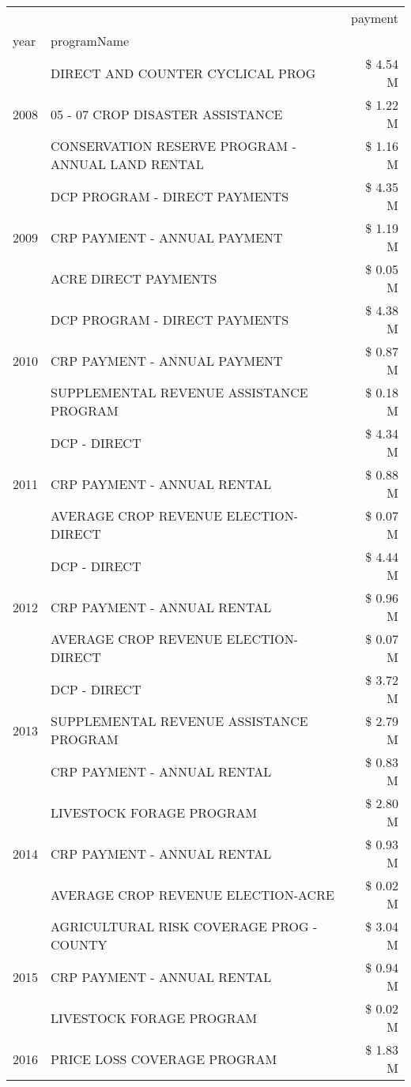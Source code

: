 \begin{tabular}{llr}
\toprule
 &  & payment \\
year & programName &  \\
\midrule
\multirow[t]{3}{*}{2008} & DIRECT AND COUNTER CYCLICAL PROG & \$ 4.54 M \\
 & 05 - 07 CROP DISASTER ASSISTANCE & \$ 1.22 M \\
 & CONSERVATION RESERVE PROGRAM - ANNUAL LAND RENTAL & \$ 1.16 M \\
\cline{1-3}
\multirow[t]{3}{*}{2009} & DCP PROGRAM - DIRECT PAYMENTS & \$ 4.35 M \\
 & CRP PAYMENT - ANNUAL PAYMENT & \$ 1.19 M \\
 & ACRE DIRECT PAYMENTS & \$ 0.05 M \\
\cline{1-3}
\multirow[t]{3}{*}{2010} & DCP PROGRAM - DIRECT PAYMENTS & \$ 4.38 M \\
 & CRP PAYMENT - ANNUAL PAYMENT & \$ 0.87 M \\
 & SUPPLEMENTAL REVENUE ASSISTANCE PROGRAM & \$ 0.18 M \\
\cline{1-3}
\multirow[t]{3}{*}{2011} & DCP - DIRECT & \$ 4.34 M \\
 & CRP PAYMENT - ANNUAL RENTAL & \$ 0.88 M \\
 & AVERAGE CROP REVENUE ELECTION-DIRECT & \$ 0.07 M \\
\cline{1-3}
\multirow[t]{3}{*}{2012} & DCP - DIRECT & \$ 4.44 M \\
 & CRP PAYMENT - ANNUAL RENTAL & \$ 0.96 M \\
 & AVERAGE CROP REVENUE ELECTION-DIRECT & \$ 0.07 M \\
\cline{1-3}
\multirow[t]{3}{*}{2013} & DCP - DIRECT & \$ 3.72 M \\
 & SUPPLEMENTAL REVENUE ASSISTANCE PROGRAM & \$ 2.79 M \\
 & CRP PAYMENT - ANNUAL RENTAL & \$ 0.83 M \\
\cline{1-3}
\multirow[t]{3}{*}{2014} & LIVESTOCK FORAGE PROGRAM & \$ 2.80 M \\
 & CRP PAYMENT - ANNUAL RENTAL & \$ 0.93 M \\
 & AVERAGE CROP REVENUE ELECTION-ACRE & \$ 0.02 M \\
\cline{1-3}
\multirow[t]{3}{*}{2015} & AGRICULTURAL RISK COVERAGE PROG - COUNTY & \$ 3.04 M \\
 & CRP PAYMENT - ANNUAL RENTAL & \$ 0.94 M \\
 & LIVESTOCK FORAGE PROGRAM & \$ 0.02 M \\
\cline{1-3}
\multirow[t]{3}{*}{2016} & PRICE LOSS COVERAGE PROGRAM & \$ 1.83 M \\

\end{tabular}
